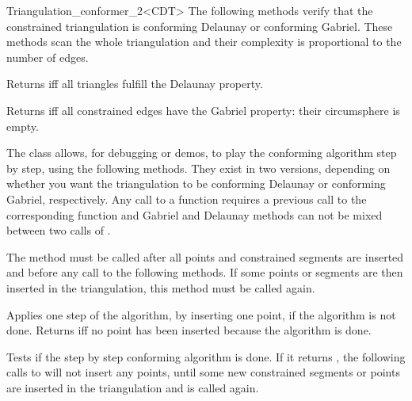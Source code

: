 \begin{ccRefClass}{Triangulation_conformer_2<CDT>}
The following methods verify that the constrained triangulation is
conforming Delaunay or conforming Gabriel. These methods scan the
whole triangulation and their complexity is proportional to the number
of edges.

{ Returns  iff all triangles fulfill the Delaunay property.}

{ Returns  iff all constrained edges have the Gabriel property:
  their circumsphere is empty. }

\begin{ccAdvanced}


The \ccRefName{} class allows, for debugging or demos, to play the
conforming algorithm step by step, using the following methods. They exist
in two versions, depending on whether you want the triangulation to be
conforming Delaunay or conforming Gabriel, respectively. Any call to a
 function requires a previous call to the
corresponding function  and Gabriel and Delaunay methods can
not be mixed between two calls of .

{ The method must be called after all points and constrained segments
  are inserted and before any call to the following methods. If some
  points or segments are then inserted in the triangulation, this
  method must be called again. }

{ Applies one step of the algorithm, by inserting one point, if the
  algorithm is not done. Returns  iff no point has been inserted
  because the algorithm is done. }



{ Tests if the step by step conforming algorithm is done. If it
  returns , the following calls to
   will not insert any points, until some
  new constrained segments or points are inserted in the triangulation and
   is called again. }

\end{ccAdvanced}

\end{ccRefClass}

